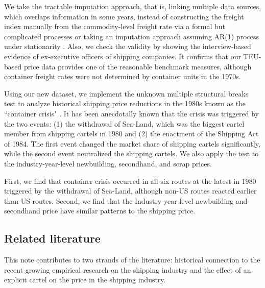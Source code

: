 \documentclass[11pt]{article}
\begin{document}
We take the tractable imputation approach, that is, linking multiple data sources, which overlaps information in some years, instead of constructing the freight index manually from the commodity-level freight rate via a formal but complicated processes or taking an imputation approach assuming AR(1) process under stationarity \citep{jeon2017learning}. Also, we check the validity by showing the interview-based evidence of ex-executive officers of shipping companies. It confirms that our TEU-based price data provides one of the reasonable benchmark measures, although container freight rates were not determined by container units in the 1970s.

Using our new dataset, we implement the unknown multiple structural breaks test \citep{bai1998estimating,bai2003computation} to analyze historical shipping price reductions in the 1980s known as the ``container crisis" \citep{broeze2002globalisation}. It has been anecdotally known that the crisis was triggered by the two events: (1) the withdrawal of Sea-Land, which was the biggest cartel member from shipping cartels in 1980 and (2) the enactment of the Shipping Act of 1984. The first event changed the market share of shipping cartels significantly, while the second event neutralized the shipping cartels. We also apply the test to the industry-year-level newbuilding, secondhand, and scrap prices.

First, we find that container crisis occurred in all six routes at the latest in 1980 triggered by the withdrawal of Sea-Land, although non-US routes reacted earlier than US routes. Second, we find that the Industry-year-level newbuilding and secondhand price have similar patterns to the shipping price.


\subsection{Related literature}\label{subsec:litereture}

This note contributes to two strands of the literature: historical connection to the recent growing empirical research on the shipping industry and the effect of an explicit cartel on the price in the shipping industry.
\end{document}
